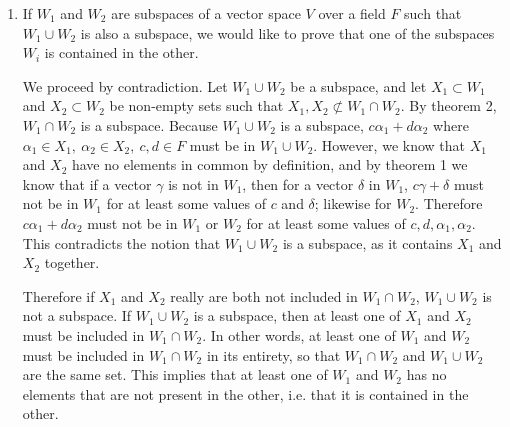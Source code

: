 \documentclass[12pt]{article}
\begin{document}
\begin{enumerate}
    \item
      If $W_1$ and $W_2$ are subspaces of a vector space $V$ over a field $F$ such
      that $W_1 \cup W_2$ is also a subspace, we would like to prove that one of the
      subspaces $W_i$ is contained in the other.

      We proceed by contradiction. Let $W_1 \cup W_2$ be a subspace, and let $X_1
      \subset W_1$ and $X_2 \subset W_2$ be non-empty sets such that $X_1,X_2
      \not\subset W_1 \cap W_2$. By theorem 2, $W_1 \cap W_2$ is a subspace. Because
      $W_1 \cup W_2$ is a subspace, $c\alpha_1 + d\alpha_2$ where $\alpha_1 \in X_1,\
      \alpha_2 \in X_2,\ c,d \in F$ must be in $W_1 \cup W_2$. However, we know that
      $X_1$ and $X_2$ have no elements in common by definition, and by theorem 1 we
      know that if a vector $\gamma$ is not in $W_1$, then for a vector $\delta$ in
      $W_1$, $c\gamma + \delta$ must not be in $W_1$ for at least some values of $c$
      and $\delta$; likewise for $W_2$. Therefore $c\alpha_1 + d\alpha_2$ must not be
      in $W_1$ or $W_2$ for at least some values of $c,d,\alpha_1,\alpha_2$. This
      contradicts the notion that $W_1 \cup W_2$ is a subspace, as it contains $X_1$
      and $X_2$ together.

      Therefore if $X_1$ and $X_2$ really are both not included in $W_1 \cap W_2$,
      $W_1 \cup W_2$ is not a subspace. If $W_1 \cup W_2$ is a subspace, then at
      least one of $X_1$ and $X_2$ must be included in $W_1 \cap W_2$. In other
      words, at least one of $W_1$ and $W_2$ must be included in $W_1 \cap W_2$ in
      its entirety, so that $W_1 \cap W_2$ and $W_1 \cup W_2$ are the same set. This
      implies that at least one of $W_1$ and $W_2$ has no elements that are not
      present in the other, i.e. that it is contained in the other.


\end{enumerate}
\end{document}
